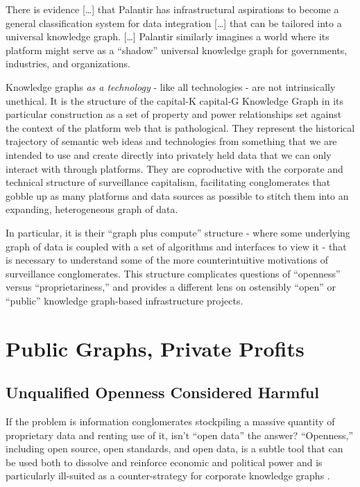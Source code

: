 \begin{leftbar}
There is evidence {[}\ldots{]} that Palantir has infrastructural
aspirations to become a general classification system for data
integration {[}\ldots{]} that can be tailored into a universal knowledge
graph. {[}\ldots{]} Palantir similarly imagines a world where its
platform might serve as a ``shadow'' universal knowledge graph for
governments, industries, and organizations. \cite{iliadisSeerSeenSurveying2022} 
\end{leftbar}

Knowledge graphs \emph{as a technology} - like all technologies - are
not intrinsically unethical. It is the structure of the capital-K
capital-G Knowledge Graph in its particular construction as a set of
property and power relationships set against the context of the platform
web that is pathological. They represent the historical trajectory of
semantic web ideas and technologies from something that we are intended
to use and create directly into privately held data that we can only
interact with through platforms. They are coproductive with the
corporate and technical structure of surveillance capitalism,
facilitating conglomerates that gobble up as many platforms and data
sources as possible to stitch them into an expanding, heterogeneous
graph of data.

In particular, it is their ``graph plus compute'' structure - where some
underlying graph of data is coupled with a set of algorithms and
interfaces to view it - that is necessary to understand some of the more
counterintuitive motivations of surveillance conglomerates. This
structure complicates questions of ``openness'' versus
``proprietariness,'' and provides a different lens on ostensibly
``open'' or ``public'' knowledge graph-based infrastructure projects.

\hypertarget{public-graphs-private-profits}{%
\section{Public Graphs, Private
Profits}\label{public-graphs-private-profits}}

\hypertarget{unqualified-openness-considered-harmful}{%
\subsection{Unqualified Openness Considered
Harmful}\label{unqualified-openness-considered-harmful}}

If the problem is information conglomerates stockpiling a massive
quantity of proprietary data and renting use of it, isn't ``open data''
the answer? ``Openness,'' including open source, open standards, and
open data, is a subtle tool that can be used both to dissolve and
reinforce economic and political power and is particularly ill-suited as
a counter-strategy for corporate knowledge graphs .

